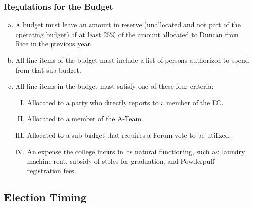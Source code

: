 \documentclass[USletter,12pt]{article}
\begin{document}
\subsubsection{Regulations for the Budget}
\begin{enumerate}[(a)]
\item A budget must leave an amount in reserve (unallocated and not part of the operating budget) of at least 25\% of the amount allocated to Duncan from Rice in the previous year.
\item All line-items of the budget must include a list of persons authorized to spend from that sub-budget.
\item All line-items in the budget must satisfy one of these four criteria:
	\begin{enumerate}[(I)]
	\item Allocated to a party who directly reports to a member of the EC.
	\item Allocated to a member of the A-Team.
	\item Allocated to a sub-budget that requires a Forum vote to be utilized.
	\item An expense the college incurs in its natural functioning, such as: laundry machine rent, subsidy of stoles for graduation, and Powderpuff registration fees.
	\end{enumerate}
\end{enumerate}


\subsection{Election Timing}
\end{document}
